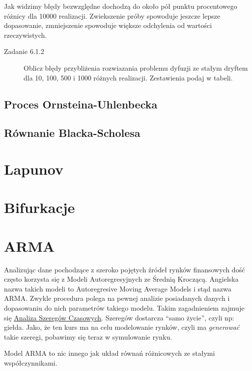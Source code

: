 \documentclass[a4paper,12pt,polish]{sphinxmanual}
\begin{document}
Jak widzimy błędy bezwzględne dochodzą do około pół punktu procentowego różnicy dla 10000
realizacji. Zwiekszenie próby spowoduje jeszcze lepsze dopasowanie, zmniejszenie spowoduje
większe odchylenia od wartości rzeczywistych.
\begin{description}
\item[{Zadanie 6.1.2}] \leavevmode
Oblicz błędy przybliżenia rozwiazania problemu dyfuzji ze stałym dryftem dla 10, 100, 500 i
1000 różnych realizacji. Zestawienia podaj w tabeli.

\end{description}


\subsection{Proces Ornsteina-Uhlenbecka}
\label{ch5/chV013:proces-ornsteina-uhlenbecka}

\subsection{Równanie Blacka-Scholesa}
\label{ch5/chV013:id1}

\section{Lapunov}
\label{ch5/chV014::doc}\label{ch5/chV014:lapunov}

\section{Bifurkacje}
\label{ch5/chV014:bifurkacje}

\section{ARMA}
\label{ch5/chV014:arma}
Analizując dane pochodzące z szeroko pojętych źródeł rynków finansowych dość często korzysta się z Modeli
Autoregresyjnych ze Średnią Kroczącą. Angielska nazwa takich modeli to Autoregresive Moving Average Models
i stąd nazwa ARMA. Zwykle procedura polega na pewnej analizie posiadanych danych i dopasowaniu
do nich parametrów takiego modelu. Takim zagadnieniem zajmuje się \href{http://el.us.edu.pl/ekonofizyka/index.php/Analiza\_Szeregów\_Czasowych}{Analiza Szeregów Czasowych}. Szeregów dostarcza ``samo życie'',
czyli np: giełda. Jako, że ten kurs ma na celu modelowanie rynków, czyli ma \emph{generować} takie szeregi,
pobawimy się teraz w symulowanie rynku.

Model ARMA to nic innego jak układ równań różnicowych ze stałymi współczynnikami.



\renewcommand{\indexname}{Indeks}
\printindex
\end{document}
